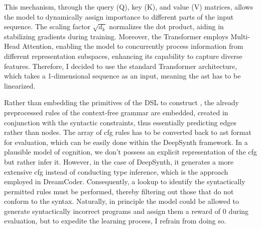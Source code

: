 This mechanism, through the query (Q), key (K), and value (V) matrices, allows the model to dynamically assign importance to different parts of the input sequence. The scaling factor $\sqrt{d_k}$ normalizes the dot product, aiding in stabilizing gradients during training. Moreover, the Transformer employs Multi-Head Attention, enabling the model to concurrently process information from different representation subspaces, enhancing its capability to capture diverse features. 
Therefore, I decided to use the standard Transformer architecture, which takes a 1-dimensional sequence as an input, meaning the \acrshort{ast} has to be linearized. 

Rather than embedding the primitives of the DSL to construct , the already preprocessed rules of the context-free grammar are embedded, created in conjunction with the syntactic constraints, thus essentially predicting edges rather than nodes. The array of \acrshort{cfg} rules has to be converted back to \acrshort{ast} format for evaluation, which can be easily done within the DeepSynth framework.
In a plausible model of cognition, we don't possess an explicit representation of the \acrshort{cfg} but rather infer it.
However, in the case of DeepSynth, it generates a more extensive \acrshort{cfg} instead of conducting type inference, which is the approach employed in DreamCoder. Consequently, a lookup to identify the syntactically permitted rules must be performed, thereby filtering out those that do not conform to the syntax. Naturally, in principle the model could be allowed to generate syntactically incorrect programs and assign them a reward of 0 during evaluation, but to expedite the learning process, I refrain from doing so.

